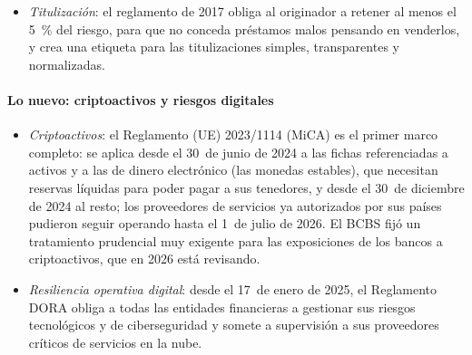\documentclass[11pt]{article}
\begin{document}
\begin{itemize}
\begin{itemize}
  \item La liquidación de las compraventas de valores pasará de 2~días a uno (T+1) el 11~de octubre de 2027\nocite{ESMA2026T1}.
  \end{itemize}
\item \emph{Titulización}: el reglamento de 2017 obliga al originador a retener al menos el 5~\% del riesgo, para que no conceda préstamos malos pensando en venderlos, y crea una etiqueta para las titulizaciones simples, transparentes y normalizadas\nocite{UE2017Titulizacion}.
\end{itemize}

\paragraph{Lo nuevo: criptoactivos y riesgos digitales}

\begin{itemize}
\item \emph{Criptoactivos}: el Reglamento (UE) 2023/1114 (MiCA) es el primer marco completo: se aplica desde el 30~de junio de 2024 a las fichas referenciadas a activos y a las de dinero electrónico (las monedas estables), que necesitan reservas líquidas para poder pagar a sus tenedores, y desde el 30~de diciembre de 2024 al resto; los proveedores de servicios ya autorizados por sus países pudieron seguir operando hasta el 1~de julio de 2026\nocite{UE2023MiCA,ESMA2026MiCA}. El BCBS fijó un tratamiento prudencial muy exigente para las exposiciones de los bancos a criptoactivos, que en 2026 está revisando\nocite{BCBS2026Cripto}.
\item \emph{Resiliencia operativa digital}: desde el 17~de enero de 2025, el Reglamento DORA obliga a todas las entidades financieras a gestionar sus riesgos tecnológicos y de ciberseguridad y somete a supervisión a sus proveedores críticos de servicios en la nube\nocite{ABE2026DORA}.
\end{itemize}
\end{document}
